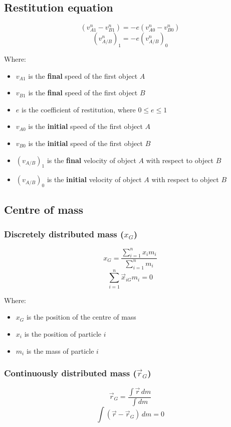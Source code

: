\documentclass[11pt]{article}
\begin{document}
\subsection{Restitution equation}
\label{sec:org402b8ea}
\[(v_{A1}^n - v_{B1}^n) = - e(v_{A0}^n - v_{B0}^n)\]
\[(v_{A/B}^n)_1 = -e (v_{A/B}^n)_0\]

Where:
\begin{itemize}
\item \(v_{A1}\) is the \textbf{final} speed of the first object \(A\)
\item \(v_{B1}\) is the \textbf{final} speed of the first object \(B\)
\item \(e\) is the coefficient of restitution, where \(0 \le e \le 1\)
\item \(v_{A0}\) is the \textbf{initial} speed of the first object \(A\)
\item \(v_{B0}\) is the \textbf{initial} speed of the first object \(B\)
\item \((v_{A/B})_1\) is the \textbf{final} velocity of object \(A\) with respect to object \(B\)
\item \((v_{A/B})_0\) is the \textbf{initial} velocity of object \(A\) with respect to object \(B\)
\end{itemize}
\subsection{Centre of mass}
\label{sec:orgddf2c6c}

\subsubsection{Discretely distributed mass (\(x_G\))}
\label{sec:org2a3dfae}
\[x_G = \frac{\sum_{i = 1}^n x_i m_i}{\sum_{i = 1}^n m_i}\]
\[\sum_{i = 1}^n \vec{x}_{iG} m_i = 0\]

Where:
\begin{itemize}
\item \(x_G\) is the position of the centre of mass
\item \(x_i\) is the position of particle \(i\)
\item \(m_i\) is the mass of particle \(i\)
\end{itemize}
\subsubsection{Continuously distributed mass (\(\vec{r}_G\))}
\label{sec:orgcab7bb3}
\[\vec{r}_G = \frac{\int \vec{r} \, dm}{\int dm}\]
\[\int (\vec{r} - \vec{r}_G) \, dm = 0\]
\end{document}
